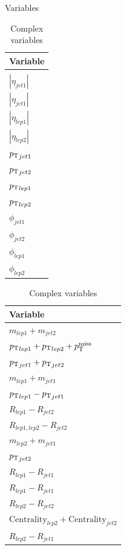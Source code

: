 \begin{frame}{Variables}
\begin{table}[h]
    \begin{minipage}{.5\linewidth}
      \centering
		\begin{tabular}{l}
		Variable         \\ \hline
		\pTmiss          \\ \hline
		$|\eta_{jet1}|$  \\ \hline
		$|\eta_{jet1}|$  \\ \hline
		$|\eta_{lep1}|$  \\ \hline
		$|\eta_{lep2}|$  \\ \hline
		${p_{\text{T}}}_{jet1}$   \\ \hline
		${p_{\text{T}}}_{jet2}$   \\ \hline
		${p_{\text{T}}}_{lep1}$   \\ \hline
		${p_{\text{T}}}_{lep2}$   \\ \hline
		$\phi_{jet1}$    \\ \hline
		$\phi_{jet2}$    \\ \hline
		$\phi_{lep1}$    \\ \hline
		$\phi_{lep2}$    \\ \hline
		\end{tabular}
		\caption{Simple kinematic variables}
    \end{minipage}%
    \begin{minipage}{.5\linewidth}
      \centering
		\begin{tabular}{l}
		Variable                   \\ \hline
		$m_{lep1} + m_{jet2}$      \\ \hline
		${p_{\text{T}}}_{lep1} + {p_{\text{T}}}_{lep2} + p_{\text{T}}^{\text{miss}}     $     \\ \hline
		${p_{\text{T}}}_{jet1} + {p_{\text{T}}}_{jet2}    $     \\ \hline
		$m_{lep1} + m_{jet1}$      \\ \hline
		${p_{\text{T}}}_{lep1} - {p_{\text{T}}}_{jet1}$\\ \hline
		${R}_{lep1} - {R}_{jet2}$    \\ \hline
		$R_{lep1, lep2} - R_{jet2}$       \\ \hline
		$m_{lep2} + m_{jet1}$        \\ \hline
		${p_{\text{T}}}_{jet2}$               \\ \hline
		${R}_{lep1} - {R}_{jet1}$	 \\ \hline
		${R}_{lep1} - {R}_{jet1}$	 \\ \hline
		${R}_{lep2} - {R}_{jet2}$	 \\ \hline
		$\text{Centrality}_{lep2} + \text{Centrality}_{jet2}$ \\ \hline
		${R}_{lep2} - {R}_{jet1}$    \\ \hline
		\end{tabular}
		\caption{Complex variables}
    \end{minipage} 
\end{table}
\end{frame}